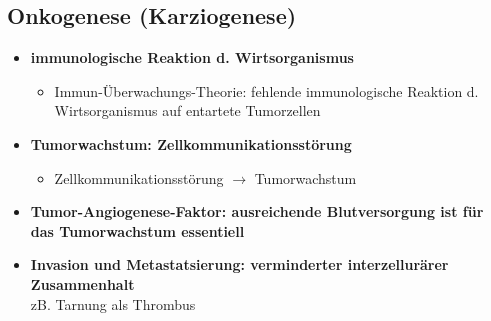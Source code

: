 	\subsection*{Onkogenese (Karziogenese)}
		\begin{itemize}
			\item \textbf{immunologische Reaktion d. Wirtsorganismus}
				\begin{itemize}
					\item Immun-Überwachungs-Theorie: fehlende immunologische Reaktion d. Wirtsorganismus auf entartete Tumorzellen
				\end{itemize}
			\item \textbf{Tumorwachstum: Zellkommunikationsstörung}
				\begin{itemize}
					\item Zellkommunikationsstörung $\rightarrow$ Tumorwachstum
				\end{itemize}
			\item \textbf{Tumor-Angiogenese-Faktor: ausreichende Blutversorgung ist für das Tumorwachstum essentiell}
			\item \textbf{Invasion und Metastatsierung: verminderter interzellurärer Zusammenhalt}\\
				zB. Tarnung als Thrombus
		\end{itemize}
	\newpage
